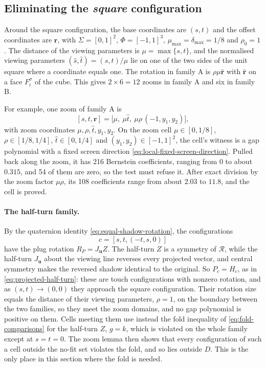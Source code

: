 \subsection{Eliminating the \emph{square} configuration}\label{subsec:eliminating-the-square-configuration}

Around the square configuration, the base coordinates are $(s,t)$ and the
offset coordinates are $\mathbf r$, with $\Sigma={[0,1]}^2$, $\Phi={[-1,1]}^3$,
$\mu_{\max}=\delta_{\max}=1/8$ and $\rho_0=1$. The distance of the viewing
parameters is $\mu=\max\{s,t\}$, and the normalised viewing parameters
$(\widehat s,\widehat t)=(s,t)/\mu$ lie on one of the two sides of the unit square
where a coordinate equals one. The rotation in family A is
$\rho\mu\widehat{\mathbf r}$ with $\widehat{\mathbf r}$ on a face $F_i^\sigma$ of the
cube. This gives $2\times6=12$ zooms in family A and six in family B.

For example, one zoom of family A is
\[
  [s,t,\mathbf r]=\bigl[\mu,\ \mu\widehat t,\ \mu\rho\,(-1,y_1,y_2)\bigr],
\]
with zoom coordinates $\mu,\rho,\widehat t,y_1,y_2$. On the zoom cell
$\mu\in[0,1/8]$, $\rho\in[1/8,1/4]$, $\widehat t\in[0,1/4]$ and
$(y_1,y_2)\in{[-1,1]}^2$, the cell's witness is a gap polynomial with
a fixed screen direction \cref{eq:local-fixed-screen-direction}. Pulled
back along the zoom, it has 216 Bernstein coefficients, ranging from $0$ to
about $0.315$, and 54 of them are zero, so the test must refuse it. After
exact division by the zoom factor $\mu\rho$, its 108 coefficients range
from about $2.03$ to $11.8$, and the cell is proved.

\paragraph{The half-turn family.}
By the quaternion identity \cref{eq:equal-shadow-rotation}, the
configurations
\[
  c=[s,t,(-t,s,0)]
\]
have the plug rotation $R_P=J_{\mathbf u}Z$. The half-turn $Z$ is a symmetry of
$\mathcal R$, while the half-turn $J_{\mathbf u}$ about the viewing line
reverses every projected vector, and central symmetry makes the reversed
shadow identical to the original. So $P_c=H_c$, as in
\cref{eq:projected-half-turn}: these are touch configurations with nonzero
rotation, and as $(s,t)\to(0,0)$ they approach the square configuration.
Their rotation size equals the distance of their viewing parameters,
$\rho=1$, on the boundary between the two families, so they meet the zoom
domains, and no gap polynomial is positive on them. Cells meeting them use
instead the fold inequality of \cref{eq:fold-comparisons} for the half-turn
$Z$, $g=k$, which is violated on the whole family except at $s=t=0$. The
zoom lemma then shows that every configuration of such a cell outside the
no-fit set violates the fold, and so lies outside $D$.
This is the only place in this section where the fold is needed.

